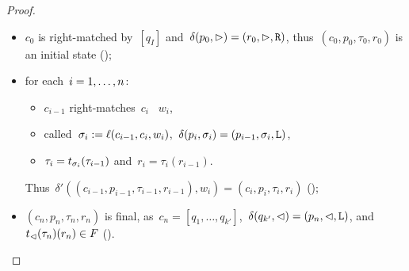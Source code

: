 \begin{proof}
	\begin{itemize}
		\item $c_0$ is right-matched by~$[q_I]$ and~$\delta(p_0,\rhd)=(r_0,\rhd,\mathtt R)$, thus~$(c_0,p_0,\tau_0,r_0)$ is an initial state ();
		\item for each~$i=1,\dots,n$:
		      \begin{itemize}
			      \item $c_{i-1}$ right-matches~$c_i$ \wrt~$w_i$,
			      \item called~$\sigma_i:=\ell(c_{i-1},c_i,w_i)$,~$\delta(p_i,\sigma_i)=(p_{i-1},\sigma_i,\mathtt L)$,
			      \item $\tau_i=t_{\sigma_i}(\tau_{i-1})$ and~$r_i=\tau_i(r_{i-1})$.
		      \end{itemize}
		      Thus~$\delta'((c_{i-1},p_{i-1},\tau_{i-1},r_{i-1}),w_i)=(c_i,p_i,\tau_i,r_i)$ ();
		\item $(c_n,p_n,\tau_n,r_n)$ is final, as~$c_n=[q_1,\dots,q_{k'}]$,~$\delta(q_{k'},\lhd)=(p_n,\lhd,\mathtt L)$, and $t_\lhd(\tau_n)(r_n)\in F$ (). \qedhere
	\end{itemize}
\end{proof}

